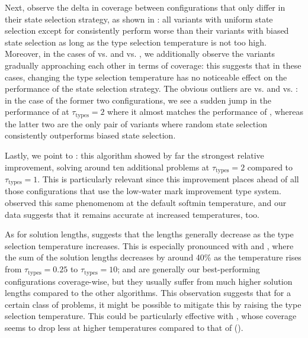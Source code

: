 Next, observe the delta in coverage between configurations that only differ in their state selection strategy, as shown in : all variants with uniform state selection except for \hiDu consistently perform worse than their variants with biased state selection as long as the type selection temperature is not too high. Moreover, in the cases of \hiHh vs. \hiHu and \lwHh vs. \lwHu, we additionally observe the variants gradually approaching each other in terms of coverage: this suggests that in these cases, changing the type selection temperature has no noticeable effect on the performance of the state selection strategy. The obvious outliers are \lwDh vs. \lwDu and \hiDh vs. \hiDu: in the case of the former two configurations, we see a sudden jump in the performance of \lwDu at $\tau_\text{types}=2$ where it almost matches the performance of \lwDh, whereas the latter two are the only pair of variants where random state selection consistently outperforms biased state selection.

Lastly, we point to \hgHu: this algorithm showed by far the strongest relative improvement, solving around ten additional problems at $\tau_\text{types}=2$ compared to $\tau_\text{types}=1$. This is particularly relevant since this improvement places \hgHu ahead of all those configurations that use the low-water mark improvement type system.  observed this same phenomenom at the default softmin temperature, and our data suggests that it remains accurate at increased temperatures, too.

As for solution lengths,  suggests that the lengths generally decrease as the type selection temperature increases. This is especially pronounced with \hiDu and \hiDh, where the sum of the solution lengths decreases by around 40\% as the temperature rises from $\tau_\text{types}=0.25$ to $\tau_\text{types}=10$; \hiDu and \hiDh are generally our best-performing configurations coverage-wise, but they usually suffer from much higher solution lengths compared to the other algorithms. This observation suggests that for a certain class of problems, it might be possible to mitigate this by raising the type selection temperature. This could be particularly effective with \hiDh, whose coverage seems to drop less at higher temperatures compared to that of \hiDu ().

